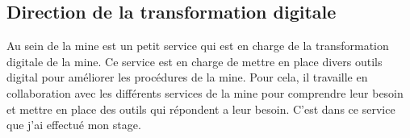\subsection{Direction de la transformation digitale}
Au sein de la mine est un petit service qui est en charge de la transformation digitale de la mine. Ce service est en charge de mettre en place divers outils digital pour améliorer les procédures de la mine. Pour cela, il travaille en collaboration avec les différents services de la mine pour comprendre leur besoin et mettre en place des outils qui répondent a leur besoin. C'est dans ce service que j'ai effectué mon stage.